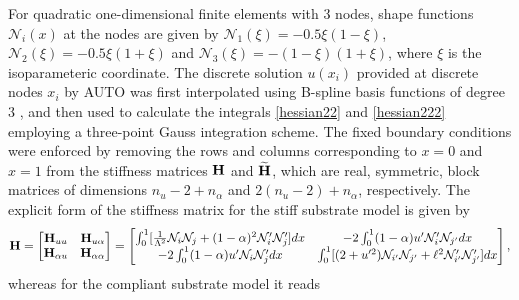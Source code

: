 For quadratic one-dimensional finite elements with 3 nodes, shape functions   ${\mathcal N}_i(x)$ at the nodes  are given by ${\mathcal N}_1(\xi)=-0.5\xi(1-\xi)$, ${\mathcal N}_2(\xi)=-0.5\xi(1+\xi)$ and ${\mathcal N}_3(\xi)=-(1-\xi)(1+\xi)$, where $\xi$ is the isoparameteric coordinate. The discrete solution $u(x_i)$ provided at discrete nodes $x_i$ by AUTO was first interpolated using B-spline basis functions of degree 3 \cite{Grimstad2016-cq}, and then used to calculate the integrals \eqref{hessian22} and \ref{hessian222} employing a three-point Gauss integration scheme. The fixed boundary conditions were enforced by removing the rows and columns corresponding to $x = 0$ and $x = 1$ from the stiffness matrices
$\mathbf{H}$ and $\widetilde{\mathbf{H}}$, {which are real, symmetric, block matrices of dimensions ${n_u-2 + n_\alpha}$ and ${2(n_u-2) + n_\alpha}$, respectively}. The explicit form of the stiffness matrix for the stiff substrate model is given by
\begin{equation}
    \mathbf{H} =
    \begin{bmatrix}
        \mathbf{H}_{uu}       & \mathbf{H}_{u\alpha}      \\
        \mathbf{H}_{\alpha u} & \mathbf{H}_{\alpha\alpha}
    \end{bmatrix}
    =
    \begin{bmatrix}
        \int_0^1[ \frac{1}{\Lambda^2}{\mathcal N}_i{\mathcal N}_j + (1-\alpha)^2{\mathcal N}'_i{\mathcal N}'_j
        ] dx &
        -2\int_0^1(1-\alpha)u' {\mathcal N}'_i {\mathcal N}_{{j'}}  dx                                                            \\
        -2\int_0^1(1-\alpha)u' {\mathcal N}_i {\mathcal N}'_j dx
             & \int_0^1 [ (2+u'^2){\mathcal N}_{{i'}}{\mathcal N}_{{j'}} +\ell^2{\mathcal N}'_{{i'}}{\mathcal N}'_{{j'}}] dx
    \end{bmatrix},
    \label{eq:stifness1}
\end{equation}
whereas for the compliant substrate model it reads
